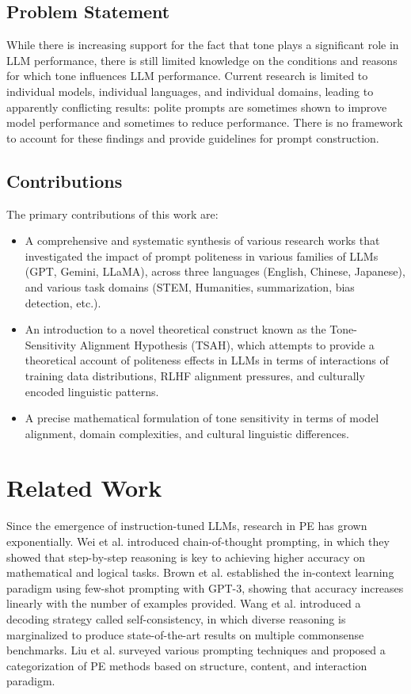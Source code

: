 \documentclass[conference]{IEEEtran}
\begin{document}
\subsection{Problem Statement}

While there is increasing support for the fact that tone plays a significant role in LLM performance, there is still limited knowledge on the conditions and reasons for which tone influences LLM performance. Current research is limited to individual models, individual languages, and individual domains, leading to apparently conflicting results: polite prompts are sometimes shown to improve model performance and sometimes to reduce performance. There is no framework to account for these findings and provide guidelines for prompt construction.

\subsection{Contributions}

The primary contributions of this work are:

\begin{itemize}
\item A comprehensive and systematic synthesis of various research works that investigated the impact of prompt politeness in various families of LLMs (GPT, Gemini, LLaMA), across three languages (English, Chinese, Japanese), and various task domains (STEM, Humanities, summarization, bias detection, etc.).
\item An introduction to a novel theoretical construct known as the Tone-Sensitivity Alignment Hypothesis (TSAH), which attempts to provide a theoretical account of politeness effects in LLMs in terms of interactions of training data distributions, RLHF alignment pressures, and culturally encoded linguistic patterns.
\item A precise mathematical formulation of tone sensitivity in terms of model alignment, domain complexities, and cultural linguistic differences.
\end{itemize}

\section{Related Work}

Since the emergence of instruction-tuned LLMs, research in PE has grown exponentially. Wei et al. \cite{b3} introduced chain-of-thought prompting, in which they showed that step-by-step reasoning is key to achieving higher accuracy on mathematical and logical tasks. Brown et al. \cite{b1} established the in-context learning paradigm using few-shot prompting with GPT-3, showing that accuracy increases linearly with the number of examples provided. Wang et al. \cite{b4} introduced a decoding strategy called self-consistency, in which diverse reasoning is marginalized to produce state-of-the-art results on multiple commonsense benchmarks. Liu et al. \cite{b2} surveyed various prompting techniques and proposed a categorization of PE methods based on structure, content, and interaction paradigm.
\end{document}
